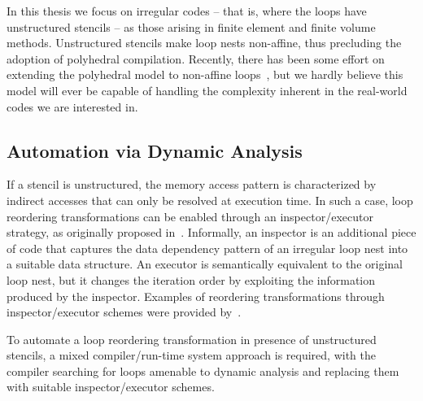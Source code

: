 In this thesis we focus on irregular codes -- that is, where the loops have unstructured stencils -- as those arising in finite element and finite volume methods. Unstructured stencils make loop nests non-affine, thus precluding the adoption of polyhedral compilation. Recently, there has been some effort on extending the polyhedral model to non-affine loops~\cite{sparse-poly-framework}, but we hardly believe this model will ever be capable of handling the complexity inherent in the real-world codes we are interested in. 


\subsection{Automation via Dynamic Analysis}
\label{sec:bkg:ie}

If a stencil is unstructured, the memory access pattern is characterized by indirect accesses that can only be resolved at execution time. In such a case, loop reordering transformations can be enabled through an inspector/executor strategy, as originally proposed in~\cite{ST-Saltz91}. Informally, an inspector is an additional piece of code that captures the data dependency pattern of an irregular loop nest into a suitable data structure. An executor is semantically equivalent to the original loop nest, but it changes the iteration order by exploiting the information produced by the inspector. Examples of reordering transformations through inspector/executor schemes were provided by~\cite{strout-reordering-transf}.

To automate a loop reordering transformation in presence of unstructured stencils, a mixed compiler/run-time system approach is required, with the compiler searching for loops amenable to dynamic analysis and replacing them with suitable inspector/executor schemes. 






